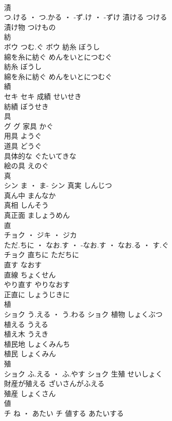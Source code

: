 \documentclass[8pt]{extreport}
\begin{document}
\begin{CJK}{UTF8}{min}
\\	漬	
\\	つ.ける ・ つ.かる ・ -ず.け ・ -ずけ		漬ける	つける	
\\	漬け物	つけもの	
\\	紡	
\\	ボウ	つむ.ぐ	ボウ	紡糸	ぼうし	
\\	綿を糸に紡ぐ	めんをいとにつむぐ	
\\	紡糸	ぼうし	
\\	綿を糸に紡ぐ	めんをいとにつむぐ	
\\	績	
\\	セキ		セキ	成績	せいせき	
\\	紡績	ぼうせき	
\\	具	
\\	グ		グ	家具	かぐ	
\\	用具	ようぐ	
\\	道具	どうぐ	
\\	具体的な	ぐたいてきな	
\\	絵の具	えのぐ	
\\	真	
\\	シン	ま ・ ま-	シン	真実	しんじつ	
\\	真ん中	まんなか	
\\	真相	しんそう	
\\	真正面	ましょうめん	
\\	直	
\\	チョク ・ ジキ ・ ジカ
\\	ただ.ちに ・ なお.す ・ -なお.す ・ なお.る ・ す.ぐ
\\	チョク	直ちに	ただちに	
\\	直す	なおす	
\\	直線	ちょくせん	
\\	やり直す	やりなおす	
\\	正直に	しょうじきに	
\\	植	
\\	ショク	う.える ・ う.わる	ショク	植物	しょくぶつ	
\\	植える	うえる	
\\	植え木	うえき	
\\	植民地	しょくみんち	
\\	植民	しょくみん	
\\	殖	
\\	ショク	ふ.える ・ ふ.やす	ショク	生殖	せいしょく	
\\	財産が殖える	ざいさんがふえる	
\\	殖産	しょくさん	
\\	値	
\\	チ	ね ・ あたい	チ	値する	あたいする	

\end{CJK}
\end{document}

